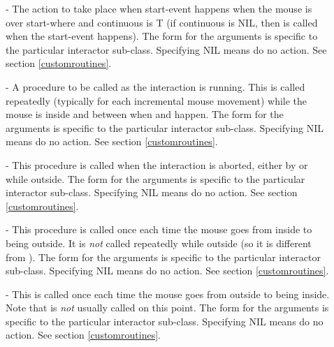 \begin{description}
\item[] 
- The action to take place when start-event happens when the mouse is over
start-where
and continuous is T (if continuous is NIL, then 
is called when the start-event happens).
The form for the arguments is specific to the
particular interactor sub-class.
Specifying NIL means do no action.  See section \ref{customroutines}.

\item[] 
- A procedure to be called as the interaction is running.  This is called
repeatedly (typically for each incremental mouse movement) while the mouse
is inside  and between when  and
 happen.  The form for the arguments is specific to the
particular interactor sub-class.  Specifying NIL means do no action.
See section \ref{customroutines}.

\item[] 
- This procedure is called when the interaction is aborted, either by
 or  while outside.
The form for the arguments is specific to the
particular interactor sub-class.  Specifying NIL means do no action.
See section \ref{customroutines}.

\item[] 
- This procedure is called once each time the mouse goes from inside
 to being outside.  It is {\it not} called repeatedly while
outside (so it is different from ).
The form for the arguments is specific to the
particular interactor sub-class.  Specifying NIL means do no action.
See section \ref{customroutines}.

\item[] 
- This is called once each time the mouse goes from outside
 to being inside.  Note that
 is {\it not} usually called on this point.
The form for the arguments is specific to the
particular interactor sub-class.  Specifying NIL means do no action.
See section \ref{customroutines}.


\end{description}
